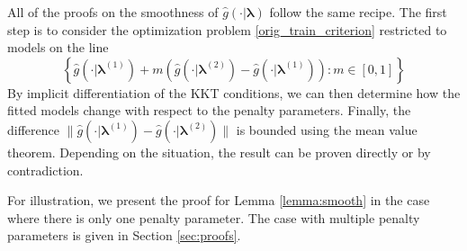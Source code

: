 \documentclass[12pt]{article}
\begin{document}
All of the proofs on the smoothness of $\hat{g}(\cdot | \boldsymbol \lambda)$ follow the same recipe. The first step is to consider the optimization problem \eqref{orig_train_criterion} restricted to models on the line
\begin{equation}
\left \{ \hat{g}(\cdot |\boldsymbol \lambda^{(1)}) + m \left (\hat{g}(\cdot |\boldsymbol \lambda^{(2)})  - \hat{g}(\cdot |\boldsymbol \lambda^{(1)}) \right ) : m \in [0,1] \right \}
\end{equation}
By implicit differentiation of the KKT conditions, we can then determine how the fitted models change with respect to the penalty parameters. Finally, the difference $\| \hat{g}(\cdot | \boldsymbol \lambda^{(1)}) -  \hat{g}(\cdot | \boldsymbol \lambda^{(2)}) \|$ is bounded using the mean value theorem. Depending on the situation, the result can be proven directly or by contradiction.

For illustration, we present the proof for Lemma \ref{lemma:smooth} in the case where there is only one penalty parameter. The case with multiple penalty parameters is given in Section \ref{sec:proofs}.
\end{document}
